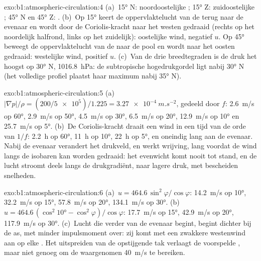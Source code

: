 \begin{solution}{exo:b1:atmospheric-circulation:4}
(a)~\ang{15} N: noordoostelijke ; \ang{15} Z: zuidoostelijke ;
\ang{45} N en \ang{45} Z: . (b)~Op \ang{15} keert de oppervlaktelucht van de  terug naar de evenaar en wordt door de Coriolis-kracht naar het westen gedraaid
(rechts op het noordelijk halfrond, links op het zuidelijk): oostelijke wind, negatief $u$. Op \ang{45} beweegt de oppervlaktelucht van de  naar de pool en wordt naar het oosten gedraaid: westelijke wind, positief $u$. (c)~Van de drie breedtegraden is de druk het hoogst op \ang{30} N,
\qty{1016.8}{hPa}: de subtropische hogedrukgordel ligt nabij \ang{30} N (het volledige profiel plaatst haar maximum nabij \ang{35} N).
\end{solution}

\begin{solution}{exo:b1:atmospheric-circulation:5}
(a)~$|\nabla p|/\rho = (200/\num{5e5})/1.225 = \qty{3.27e-4}{m.s^{-2}}$, gedeeld door
$f$: \qty{2.6}{m/s} op \ang{60}, \qty{2.9}{m/s} op \ang{50}, \qty{4.5}{m/s} op
\ang{30}, \qty{6.5}{m/s} op \ang{20}, \qty{12.9}{m/s} op \ang{10} en
\qty{25.7}{m/s} op \ang{5}. (b)~De Coriolis-kracht draait een wind in een tijd van de orde van
$1/f$: \qty{2.2}{h} op \ang{60}, \qty{11}{h} op \ang{10}, \qty{22}{h} op \ang{5}, en
oneindig lang aan de evenaar. Nabij de evenaar verandert het drukveld, en werkt wrijving, lang voordat de wind langs de isobaren kan worden gedraaid: het evenwicht komt nooit tot stand, en de lucht stroomt deels langs de drukgradiënt, naar lagere druk, met bescheiden snelheden.
\end{solution}

\begin{solution}{exo:b1:atmospheric-circulation:6}
(a)~$u = 464.6\,\sin^2\varphi/\cos\varphi$: \qty{14.2}{m/s} op \ang{10},
\qty{32.2}{m/s} op \ang{15}, \qty{57.8}{m/s} op \ang{20}, \qty{134.1}{m/s} op
\ang{30}. (b)~$u = 464.6\,(\cos^2\ang{10} - \cos^2\varphi)/\cos\varphi$:
\qty{17.7}{m/s} op \ang{15}, \qty{42.9}{m/s} op \ang{20}, \qty{117.9}{m/s} op
\ang{30}. (c)~Lucht die verder van de evenaar begint, begint dichter bij de as, met minder impulsmoment over: zij komt met een zwakkere westenwind aan op elke . Het uitspreiden van de opstijgende tak verlaagt de voorspelde , maar niet genoeg om de waargenomen \qty{40}{m/s} te bereiken.
\end{solution}


